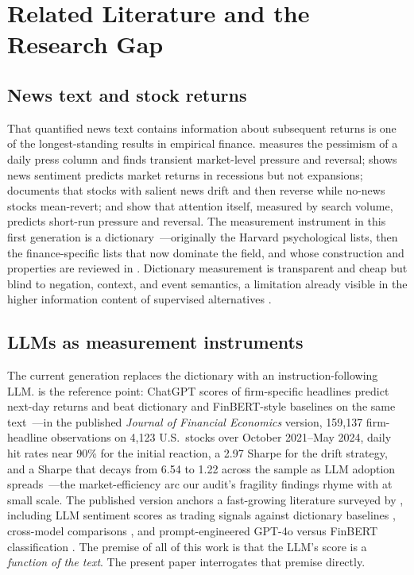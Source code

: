 \section{Related Literature and the Research Gap}\label{sec:lit}

\subsection{News text and stock returns}

That quantified news text contains information about subsequent returns is one of the longest-standing results in empirical finance. \citet{tetlock2007} measures the pessimism of a daily press column and finds transient market-level pressure and reversal; \citet{garcia2013} shows news sentiment predicts market returns in recessions but not expansions; \citet{chan2003} documents that stocks with salient news drift and then reverse while no-news stocks mean-revert; and \citet{da2011} show that attention itself, measured by search volume, predicts short-run pressure and reversal. The measurement instrument in this first generation is a dictionary~---originally the Harvard psychological lists, then the finance-specific \citet{loughran2011} lists that now dominate the field, and whose construction and properties are reviewed in \citet{loughran2016}. Dictionary measurement is transparent and cheap but blind to negation, context, and event semantics, a limitation already visible in the higher information content of supervised alternatives \citep{jegadeesh2013}.

\subsection{LLMs as measurement instruments}

The current generation replaces the dictionary with an instruction-following LLM. \citet{lopezlira2026} is the reference point: ChatGPT scores of firm-specific headlines predict next-day returns and beat dictionary and FinBERT-style baselines on the same text~---in the published \emph{Journal of Financial Economics} version, 159,137 firm-headline observations on 4,123 U.S.\ stocks over October 2021--May 2024, daily hit rates near 90\% for the initial reaction, a 2.97 Sharpe for the drift strategy, and a Sharpe that decays from 6.54 to 1.22 across the sample as LLM adoption spreads~---the market-efficiency arc our audit's fragility findings rhyme with at small scale. The published version anchors a fast-growing literature surveyed by \citet{nie2024survey}, including LLM sentiment scores as trading signals against dictionary baselines \citep{kirtac2024}, cross-model comparisons \citep{teles2025}, and prompt-engineered GPT-4o versus FinBERT classification \citep{kang2025}. The premise of all of this work is that the LLM's score is a \emph{function of the text}. The present paper interrogates that premise directly.

